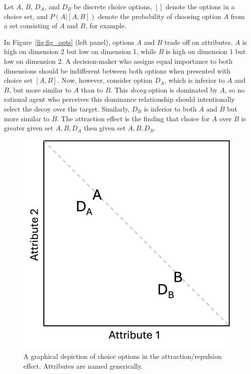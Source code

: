 Let $A$, $B$, $D_{A}$, and $D_{B}$ be discrete choice options, $[]$ denote the options in a choice set, and $P(A|[A,B])$ denote the probability of choosing option $A$ from a set consisting of $A$ and $B$, for example. 

In Figure~\ref{fig:fig_opts} (left panel), options $A$ and $B$ trade off on attributes. $A$ is high on dimension 2 but low on dimension 1, while $B$ is high on dimension 1 but low on dimension 2. A decision-maker who assigns equal importance to both dimensions should be indifferent between both options when presented with choice set $[A,B]$. Now, however, consider option $D_{A}$, which is inferior to $A$ and $B$, but more similar to $A$ than to $B$. This \textit{decoy} option is dominated by $A$, so no rational agent who perceives this dominance relationship should intentionally select the decoy over the target. Similarly, $D_{B}$ is inferior to both $A$ and $B$ but more similar to $B$. The attraction effect is the finding that choice for $A$ over $B$ is greater given set ${A,B,D_{A}}$ then given set $A,B,D_{B}$. 


\begin{figure}
    \includegraphics[width=\linewidth]{figures/att_stim.jpg}
   \caption{A graphical depiction of choice options in the attraction/repulsion effect. Attributes are named generically.}
   \label{fig:att_stim}
\end{figure}

